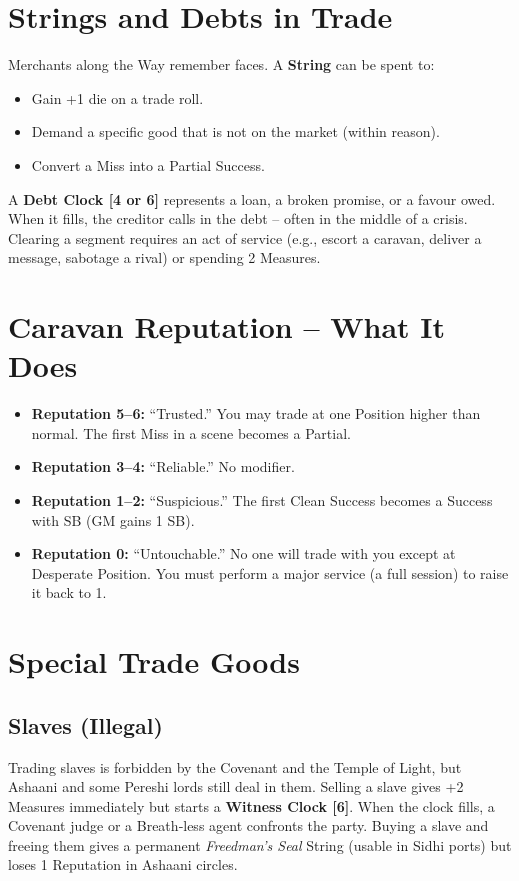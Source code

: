 \documentclass[11pt]{book}
\begin{document}
\section{Strings and Debts in Trade}

Merchants along the Way remember faces. A \textbf{String} can be spent to:
\begin{itemize}
    \item Gain +1 die on a trade roll.
    \item Demand a specific good that is not on the market (within reason).
    \item Convert a Miss into a Partial Success.
\end{itemize}

A \textbf{Debt Clock [4 or 6]} represents a loan, a broken promise, or a favour owed. When it fills, the creditor calls in the debt – often in the middle of a crisis. Clearing a segment requires an act of service (e.g., escort a caravan, deliver a message, sabotage a rival) or spending 2 Measures.

\section{Caravan Reputation – What It Does}
\begin{itemize}
    \item \textbf{Reputation 5–6:} “Trusted.” You may trade at one Position higher than normal. The first Miss in a scene becomes a Partial.
    \item \textbf{Reputation 3–4:} “Reliable.” No modifier.
    \item \textbf{Reputation 1–2:} “Suspicious.” The first Clean Success becomes a Success with SB (GM gains 1 SB).
    \item \textbf{Reputation 0:} “Untouchable.” No one will trade with you except at Desperate Position. You must perform a major service (a full session) to raise it back to 1.
\end{itemize}

\section{Special Trade Goods}

\subsection{Slaves (Illegal)}
Trading slaves is forbidden by the Covenant and the Temple of Light, but Ashaani and some Pereshi lords still deal in them. Selling a slave gives +2 Measures immediately but starts a \textbf{Witness Clock [6]}. When the clock fills, a Covenant judge or a Breath‑less agent confronts the party. Buying a slave and freeing them gives a permanent \textit{Freedman’s Seal} String (usable in Sidhi ports) but loses 1 Reputation in Ashaani circles.
\end{document}
